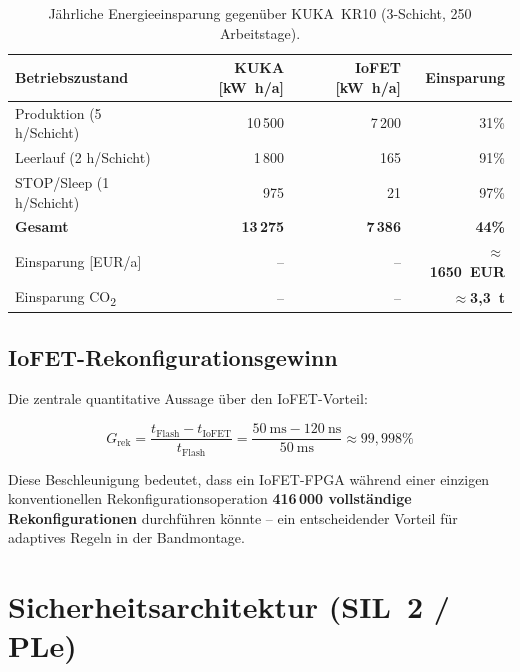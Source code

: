 ﻿\documentclass[a4paper,12pt]{scrreprt}
\theoremstyle{definition}
\begin{document}
\begin{table}[H]
\centering
\caption{Jährliche Energieeinsparung gegenüber KUKA~KR10 (3-Schicht, 250 Arbeitstage).}
\label{tab:energy_saving}
\small
\begin{tabular}{|l|r|r|r|}
\hline
\rowcolor{fpgagreen!20}
\textbf{Betriebszustand} & \textbf{KUKA [\si{\kilo\watt\hour/a}]} &
  \textbf{IoFET [\si{\kilo\watt\hour/a}]} & \textbf{Einsparung} \\
\hline
Produktion (5 h/Schicht) & 10\,500 & 7\,200 & 31\% \\
\hline
Leerlauf (2 h/Schicht) & 1\,800 & 165 & 91\% \\
\hline
STOP/Sleep (1 h/Schicht) & 975 & 21 & 97\% \\
\hline
\textbf{Gesamt} & \textbf{13\,275} & \textbf{7\,386} & \textbf{44\%} \\
\hline
Einsparung [EUR/a] & -- & -- & \textbf{$\approx$1650~EUR} \\
\hline
Einsparung CO\textsubscript{2} & -- & -- & \textbf{$\approx$3{,}3~t} \\
\hline
\end{tabular}
\end{table}

\subsection{IoFET-Rekonfigurationsgewinn}

Die zentrale quantitative Aussage über den IoFET-Vorteil:

\begin{equation}
  G_{\text{rek}} = \frac{t_{\text{Flash}} - t_{\text{IoFET}}}{t_{\text{Flash}}}
  = \frac{\SI{50}{\milli\second} - \SI{120}{\nano\second}}{\SI{50}{\milli\second}}
  \approx 99{,}998\%
\end{equation}

Diese Beschleunigung bedeutet, dass ein IoFET-FPGA während einer
einzigen konventionellen Rekonfigurationsoperation
\textbf{416\,000 vollständige Rekonfigurationen} durchführen könnte --
ein entscheidender Vorteil für adaptives Regeln in der Bandmontage.

\section{Sicherheitsarchitektur (SIL~2 / PLe)}
\end{document}
